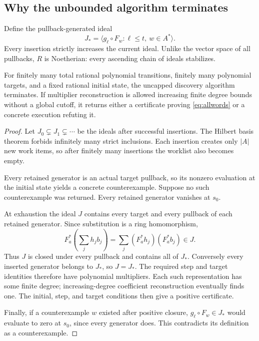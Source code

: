 \subsection{Why the unbounded algorithm terminates}

Define the pullback-generated ideal
\[
 J_* = \big\langle g_\ell\circ F_w:\ell\le t,\ w\in A^*\big\rangle.
\]
Every insertion strictly increases the current ideal. Unlike the vector space of all pullbacks, $R$ is Noetherian: every ascending chain of ideals stabilizes.

\begin{theorem}
For finitely many total rational polynomial transitions, finitely many polynomial targets, and a fixed rational initial state, the uncapped discovery algorithm terminates. If multiplier reconstruction is allowed increasing finite degree bounds without a global cutoff, it returns either a certificate proving \eqref{eq:allwords} or a concrete execution refuting it.
\end{theorem}
\begin{proof}
Let $J_0\subsetneq J_1\subsetneq\cdots$ be the ideals after successful insertions. The Hilbert basis theorem forbids infinitely many strict inclusions. Each insertion creates only $|A|$ new work items, so after finitely many insertions the worklist also becomes empty.

Every retained generator is an actual target pullback, so its nonzero evaluation at the initial state yields a concrete counterexample. Suppose no such counterexample was returned. Every retained generator vanishes at $s_0$.

At exhaustion the ideal $J$ contains every target and every pullback of each retained generator. Since substitution is a ring homomorphism,
\[
 F_a^*\left(\sum_jh_jb_j\right)
 =\sum_j(F_a^*h_j)(F_a^*b_j)\in J.
\]
Thus $J$ is closed under every pullback and contains all of $J_*$. Conversely every inserted generator belongs to $J_*$, so $J=J_*$. The required step and target identities therefore have polynomial multipliers. Each such representation has some finite degree; increasing-degree coefficient reconstruction eventually finds one. The initial, step, and target conditions then give a positive certificate.

Finally, if a counterexample $w$ existed after positive closure, $g_\ell\circ F_w\in J_*$ would evaluate to zero at $s_0$, since every generator does. This contradicts its definition as a counterexample.
\end{proof}

